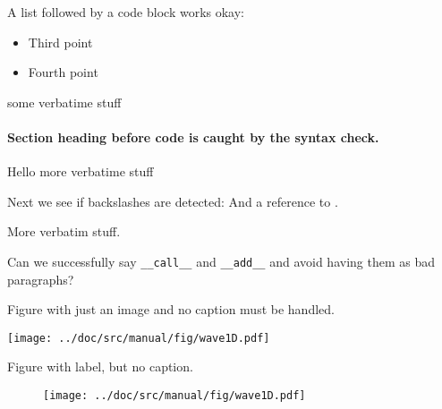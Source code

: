\documentclass[%
oneside,                 %
final,                   %
10pt]{article}
\newcounter{doconce:movie:counter}
\begin{document}

\newcommand{\exercisesection}[1]{\subsection*{#1}}







A list followed by a code block works okay:

\begin{itemize}
  \item Third point

  \item Fourth point
\end{itemize}

\noindent
\bcod
some verbatime stuff
\ecod

\paragraph{Section heading before code is caught by the syntax check.}
\label{my} 

Hello
\bccq
more verbatime stuff
\eccq

Next we see if backslashes are detected: \label{mylab}
And a reference to \cite{mybook}.

\bccq
More verbatim stuff.
\eccq

Can we successfully say \Verb!__call__! and \Verb!__add__! and avoid having them as
bad paragraphs?

Figure with just an image and no caption must be handled.

\vspace{6mm}

\centerline{\texttt{[image: ../doc/src/manual/fig/wave1D.pdf]}}

\vspace{6mm}

Figure with label, but no caption.

\begin{figure}[!ht]  %
  \centerline{\texttt{[image: ../doc/src/manual/fig/wave1D.pdf]}}
  \caption{
  \label{myl1}
  }
\end{figure}
\end{document}
